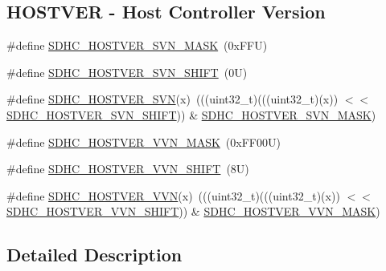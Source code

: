 \subsection*{H\+O\+S\+T\+V\+ER -\/ Host Controller Version}
\begin{DoxyCompactItemize}
\item 
\#define \mbox{\hyperlink{group___s_d_h_c___register___masks_ga922683bd06f7936f2978aac6f943ca90}{S\+D\+H\+C\+\_\+\+H\+O\+S\+T\+V\+E\+R\+\_\+\+S\+V\+N\+\_\+\+M\+A\+SK}}~(0x\+F\+F\+U)
\item 
\#define \mbox{\hyperlink{group___s_d_h_c___register___masks_gab6a2f24b88cbb5db5621995be9e56bcd}{S\+D\+H\+C\+\_\+\+H\+O\+S\+T\+V\+E\+R\+\_\+\+S\+V\+N\+\_\+\+S\+H\+I\+FT}}~(0\+U)
\item 
\#define \mbox{\hyperlink{group___s_d_h_c___register___masks_gabc6936d685c8222c70b386e4d59e230a}{S\+D\+H\+C\+\_\+\+H\+O\+S\+T\+V\+E\+R\+\_\+\+S\+VN}}(x)~(((uint32\+\_\+t)(((uint32\+\_\+t)(x)) $<$$<$ \mbox{\hyperlink{group___s_d_h_c___register___masks_gab6a2f24b88cbb5db5621995be9e56bcd}{S\+D\+H\+C\+\_\+\+H\+O\+S\+T\+V\+E\+R\+\_\+\+S\+V\+N\+\_\+\+S\+H\+I\+FT}})) \& \mbox{\hyperlink{group___s_d_h_c___register___masks_ga922683bd06f7936f2978aac6f943ca90}{S\+D\+H\+C\+\_\+\+H\+O\+S\+T\+V\+E\+R\+\_\+\+S\+V\+N\+\_\+\+M\+A\+SK}})
\item 
\#define \mbox{\hyperlink{group___s_d_h_c___register___masks_ga8fd5f14b61267f8ef598236b95cb3b7d}{S\+D\+H\+C\+\_\+\+H\+O\+S\+T\+V\+E\+R\+\_\+\+V\+V\+N\+\_\+\+M\+A\+SK}}~(0x\+F\+F00\+U)
\item 
\#define \mbox{\hyperlink{group___s_d_h_c___register___masks_ga706bd372f8258fdf62c2e50ff2c5ee99}{S\+D\+H\+C\+\_\+\+H\+O\+S\+T\+V\+E\+R\+\_\+\+V\+V\+N\+\_\+\+S\+H\+I\+FT}}~(8\+U)
\item 
\#define \mbox{\hyperlink{group___s_d_h_c___register___masks_ga41ed3752ccdbb977313a4b1c8c2574c2}{S\+D\+H\+C\+\_\+\+H\+O\+S\+T\+V\+E\+R\+\_\+\+V\+VN}}(x)~(((uint32\+\_\+t)(((uint32\+\_\+t)(x)) $<$$<$ \mbox{\hyperlink{group___s_d_h_c___register___masks_ga706bd372f8258fdf62c2e50ff2c5ee99}{S\+D\+H\+C\+\_\+\+H\+O\+S\+T\+V\+E\+R\+\_\+\+V\+V\+N\+\_\+\+S\+H\+I\+FT}})) \& \mbox{\hyperlink{group___s_d_h_c___register___masks_ga8fd5f14b61267f8ef598236b95cb3b7d}{S\+D\+H\+C\+\_\+\+H\+O\+S\+T\+V\+E\+R\+\_\+\+V\+V\+N\+\_\+\+M\+A\+SK}})
\end{DoxyCompactItemize}


\subsection{Detailed Description}


